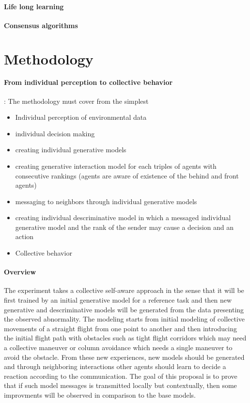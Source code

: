 \documentclass{article}
\begin{document}
		\paragraph{Life long learning}
		\paragraph{Consensus algorithms}
		
	\section{Methodology}
		\paragraph{From individual perception to collective behavior}: The methodology must cover from the simplest  
			\begin{itemize}
				\item Individual perception of environmental data
				\item individual decision making
				\item creating individual generative models
				\item creating generative interaction model for each triples of agents with consecutive rankings (agents are aware of existence of the behind and front agents)
				\item messaging to neighbors through individual generative models
				\item creating individual descriminative model in which a messaged individual generative model and the rank of the sender may cause a decision and an action 
				\item Collective behavior 
			\end{itemize}
	
		\paragraph{Overview} The experiment takes a collective self-aware approach in the sense that it will be first trained by an initial generative model for a reference task and then new generative and descriminative models will be generated from the data presenting the observed abnormality. The modeling starts from initial modeling of collective movements of a straight flight from one point to another and then introducing the initial flight path with obstacles such as tight flight corridors which may need a collective maneuver or column avoidance which needs a single maneuver to avoid the obstacle. From these new experiences, new models should be generated and through neighboring interactions other agents should learn to decide a reaction according to the communication. The goal of this proposal is to prove that if such model messages is transmitted locally but contextually, then some improvments will be observed in comparison to the base models.   
		
\end{document}
